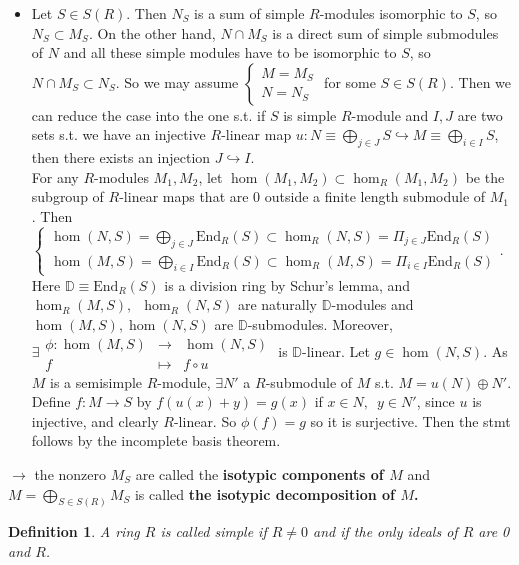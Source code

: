 \documentclass[12pt,letterpaper]{report}
\newtheorem{definition}{Definition}[section]
\begin{document}
\begin{itemize}
\item
Let $S\in S(R)$. Then $N_{S}$ is a sum of simple $R$-modules isomorphic to $S$, so $N_{S}\subset M_{S}$. On the other hand, $N\cap M_{S}$ is a direct sum of simple submodules of $N$ and all these simple modules have to be isomorphic to $S$, so $N\cap M_{S}\subset N_{S}$. So we may assume $\left\{\begin{array}{r}M=M_{S}\\N=N_{S}\end{array}\right.$ for some $S\in S(R)$. Then we can reduce the case into the one s.t. if $S$ is simple $R$-module and $I,J$ are two sets s.t. we have an injective $R$-linear map $u:N\equiv\bigoplus_{j\in J}S\hookrightarrow M\equiv\bigoplus_{i\in I}S$, then there exists an injection $J\hookrightarrow I$. 
\\For any $R$-modules $M_{1},M_{2}$, let $\hom(M_{1},M_{2})\subset\hom_{R}(M_{1},M_{2})$ be the subgroup of $R$-linear maps that are 0 outside a finite length submodule of $M_{1}$. Then $\left\{\begin{array}{r}\hom(N,S)=\bigoplus_{j\in J}\text{End}_{R}(S)\subset\hom_{R}(N,S)=\Pi_{j\in J}\text{End}_{R}(S)\\\hom(M,S)=\bigoplus_{i\in I}\text{End}_{R}(S)\subset\hom_{R}(M,S)=\Pi_{i\in I}\text{End}_{R}(S)\end{array}\right.$. Here $\mathbb{D}\equiv\text{End}_{R}(S)$ is a division ring by Schur's lemma, and $\hom_{R}(M,S),\,\,\,\hom_{R}(N,S)$ are naturally $\mathbb{D}$-modules and $\hom(M,S),\hom(N,S)$ are $\mathbb{D}$-submodules. Moreover, $\exists\begin{array}{rrr}\phi:\hom(M,S)&\rightarrow&\hom(N,S)\\f&\mapsto&f\circ u\end{array}$ is $\mathbb{D}$-linear. Let $g\in \hom(N,S)$. As $M$ is a semisimple $R$-module, $\exists N'$ a $R$-submodule of $M$ s.t. $M=u(N)\oplus N'$. Define $f:M\rightarrow S$ by $f(u(x)+y)=g(x)$ if $x\in N,\,\,\,y\in N'$, since $u$ is injective, and clearly $R$-linear. So $\phi(f)=g$ so it is surjective. Then the stmt follows by the incomplete basis theorem. 
\end{itemize}
$\rightarrow $ the nonzero $M_{S}$ are called the \textbf{isotypic components of $M$} and $M=\bigoplus_{S\in S(R)}M_{S}$ is called \textbf{the isotypic decomposition of $M$. }
\begin{definition}A ring $R$ is called simple if $R\neq0$ and if the only ideals of $R$ are 0 and $R$.\end{definition}
\end{document}
